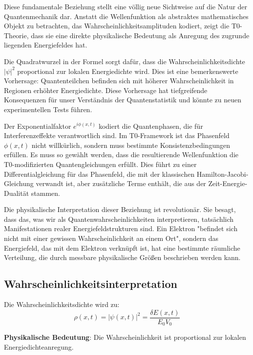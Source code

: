 \documentclass[12pt,a4paper]{article}
\newcommand{\deltaE}{\delta E}
\theoremstyle{definition}
\theoremstyle{remark}
\begin{document}
Diese fundamentale Beziehung stellt eine völlig neue Sichtweise auf die Natur der Quantenmechanik dar. Anstatt die Wellenfunktion als abstraktes mathematisches Objekt zu betrachten, das Wahrscheinlichkeitsamplituden kodiert, zeigt die T0-Theorie, dass sie eine direkte physikalische Bedeutung als Anregung des zugrunde liegenden Energiefeldes hat.

Die Quadratwurzel in der Formel sorgt dafür, dass die Wahrscheinlichkeitsdichte $|\psi|^2$ proportional zur lokalen Energiedichte wird. Dies ist eine bemerkenswerte Vorhersage: Quantenteilchen befinden sich mit höherer Wahrscheinlichkeit in Regionen erhöhter Energiedichte. Diese Vorhersage hat tiefgreifende Konsequenzen für unser Verständnis der Quantenstatistik und könnte zu neuen experimentellen Tests führen.

Der Exponentialfaktor $e^{i\phi(x,t)}$ kodiert die Quantenphasen, die für Interferenzeffekte verantwortlich sind. Im T0-Framework ist das Phasenfeld $\phi(x,t)$ nicht willkürlich, sondern muss bestimmte Konsistenzbedingungen erfüllen. Es muss so gewählt werden, dass die resultierende Wellenfunktion die T0-modifizierten Quantengleichungen erfüllt. Dies führt zu einer Differentialgleichung für das Phasenfeld, die mit der klassischen Hamilton-Jacobi-Gleichung verwandt ist, aber zusätzliche Terme enthält, die aus der Zeit-Energie-Dualität stammen.

Die physikalische Interpretation dieser Beziehung ist revolutionär. Sie besagt, dass das, was wir als Quantenwahrscheinlichkeiten interpretieren, tatsächlich Manifestationen realer Energiefeldstrukturen sind. Ein Elektron "befindet sich nicht mit einer gewissen Wahrscheinlichkeit an einem Ort", sondern das Energiefeld, das mit dem Elektron verknüpft ist, hat eine bestimmte räumliche Verteilung, die durch messbare physikalische Größen beschrieben werden kann.

\subsection{Wahrscheinlichkeitsinterpretation}

Die Wahrscheinlichkeitsdichte wird zu:
\begin{equation}
	\rho(x,t) = |\psi(x,t)|^2 = \frac{\deltaE(x,t)}{E_0 V_0}
	\label{eq:probability_density}
\end{equation}

\textbf{Physikalische Bedeutung}: Die Wahrscheinlichkeit ist proportional zur lokalen Energiedichteanregung.
\end{document}
